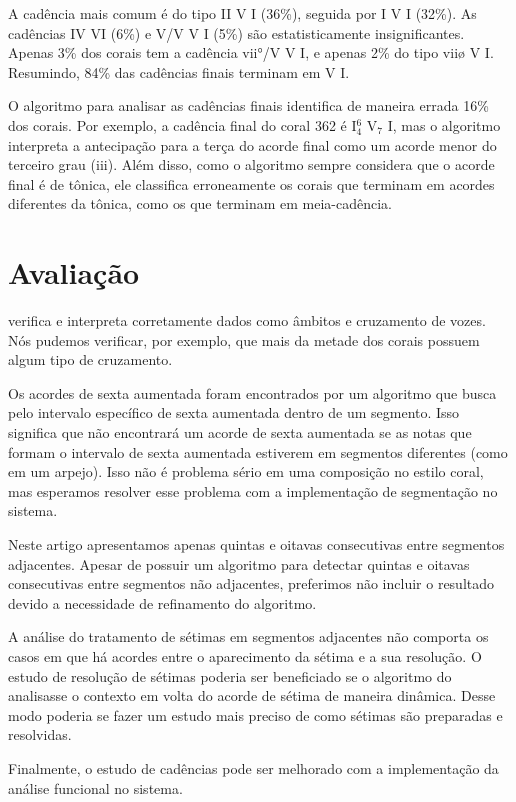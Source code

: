 A cadência mais comum é do tipo II V I (36\%), seguida por I V I
(32\%). As cadências IV VI (6\%) e V/V V I (5\%) são estatisticamente
insignificantes. Apenas 3\% dos corais tem a cadência vii°/V V I, e
apenas 2\% do tipo viiø V I. Resumindo, 84\% das cadências finais
terminam em V I.

O algoritmo para analisar as cadências finais identifica de maneira
errada 16\% dos corais. Por exemplo, a cadência final do coral 362 é
I$^6_4$ V$_7$ I, mas o algoritmo interpreta a antecipação para a terça
do acorde final como um acorde menor do terceiro grau (iii). Além
disso, como o algoritmo sempre considera que o acorde final é de
tônica, ele classifica erroneamente os corais que terminam em acordes
diferentes da tônica, como os que terminam em meia-cadência.

\section{Avaliação}
\label{sec:avaliacao}

\rameau{} verifica e interpreta corretamente dados como âmbitos e
cruzamento de vozes. Nós pudemos verificar, por exemplo, que mais da
metade dos corais possuem algum tipo de cruzamento.

Os acordes de sexta aumentada foram encontrados por um algoritmo que
busca pelo intervalo específico de sexta aumentada dentro de um
segmento. Isso significa que \rameau{} não encontrará um acorde de
sexta aumentada se as notas que formam o intervalo de sexta aumentada
estiverem em segmentos diferentes (como em um arpejo). Isso não é
problema sério em uma composição no estilo coral, mas esperamos
resolver esse problema com a implementação de segmentação no sistema.

Neste artigo apresentamos apenas quintas e oitavas consecutivas entre
segmentos adjacentes. Apesar de \rameau{} possuir um algoritmo para
detectar quintas e oitavas consecutivas entre segmentos não
adjacentes, preferimos não incluir o resultado devido a necessidade de
refinamento do algoritmo.

A análise do tratamento de sétimas em segmentos adjacentes não
comporta os casos em que há acordes entre o aparecimento da sétima e a
sua resolução. O estudo de resolução de sétimas poderia ser
beneficiado se o algoritmo do \rameau{} analisasse o contexto em volta
do acorde de sétima de maneira dinâmica. Desse modo poderia se fazer
um estudo mais preciso de como sétimas são preparadas e resolvidas.

Finalmente, o estudo de cadências pode ser melhorado com a
implementação da análise funcional no sistema.

